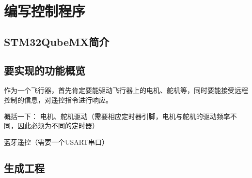 \documentclass{article}
\begin{document}
\section{编写控制程序}
\subsection{STM32QubeMX简介}
\subsection{要实现的功能概览}
作为一个飞行器，首先肯定要能驱动飞行器上的电机、舵机等，同时要能接受远程控制的信息，对遥控指令进行响应。

概括一下：
电机、舵机驱动（需要相应定时器引脚，电机与舵机的驱动频率不同，因此必须为不同的定时器）

蓝牙遥控（需要一个USART串口）

\subsection{生成工程}
\end{document}
